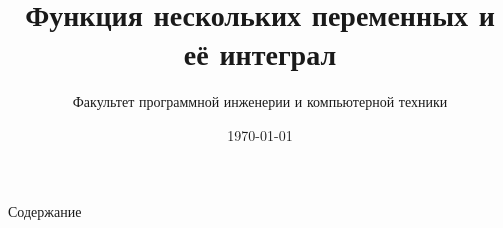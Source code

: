 \documentclass[10pt,xcolor={table,dvipsnames},t]{beamer}
\title[Presentazione]{Функция нескольких переменных и её интеграл}
\subtitle{Факультет программной инженерии и компьютерной техники}
\institute{Университет ИТМО}
\date{\today}
\begin{document}
\begin{frame}
  \titlepage
\end{frame}

\begin{frame}{Содержание}
  \tableofcontents[hideothersubsections]
\end{frame}







\end{document}
